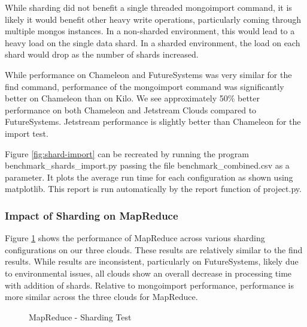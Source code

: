 \documentclass[9pt,twocolumn,twoside]{../../styles/osajnl}
\begin{document}
While sharding did not benefit a single threaded mongoimport command,
it is likely it would benefit other heavy write operations,
particularly coming through multiple mongos instances. In a
non-sharded environment, this would lead to a heavy load on the single
data shard. In a sharded environment, the load on each shard would
drop as the number of shards increased.

While performance on Chameleon and FutureSystems was very similar for
the find command, performance of the mongoimport command was
significantly better on Chameleon than on Kilo. We see approximately
50\% better performance on both Chameleon and Jetstream Clouds
compared to FutureSystems. Jetstream performance is slightly better
than Chameleon for the import test.

Figure \ref{fig:shard-import} can be recreated by running the program
benchmark\_shards\_import.py passing the file benchmark\_combined.csv
as a parameter. It plots the average run time for each configuration
as shown using matplotlib. This report is run automatically by the
report function of project.py.

\subsubsection{Impact of Sharding on MapReduce}



Figure \ref{fig:shard-mapreduce} shows the performance of MapReduce
across various sharding configurations on our three clouds. These
results are relatively similar to the find results. While results are
inconsistent, particularly on FutureSystems, likely due to
environmental issues, all clouds show an overall decrease in
processing time with addition of shards. Relative to mongoimport
performance, performance is more similar across the three clouds for
MapReduce.

\begin{figure}[htbp]
\centering
{}
\caption{MapReduce - Sharding Test}
\label{fig:shard-mapreduce}
\end{figure}
\end{document}
